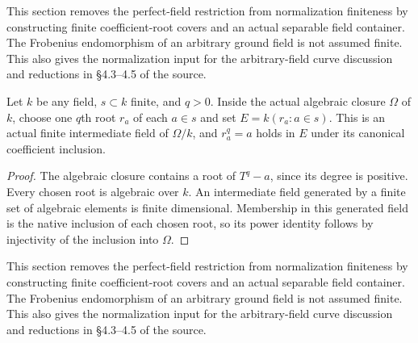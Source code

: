 \begingroup

This section removes the perfect-field restriction from normalization
finiteness by constructing finite coefficient-root covers and an actual
separable field container. The Frobenius endomorphism of an arbitrary
ground field is not assumed finite. This also gives the normalization
input for the arbitrary-field curve discussion and reductions in
\S4.3--4.5 of the source.

\begin{lemma}
\label{lem:normalization-finite-coefficient-root-field}
\leanok
Let $k$ be any field, $s\subset k$ finite, and $q>0$. Inside the actual
algebraic closure $\Omega$ of $k$, choose one $q$th root $r_a$ of each
$a\in s$ and set $E=k(r_a:a\in s)$. This is an actual finite intermediate
field of $\Omega/k$, and $r_a^q=a$ holds in $E$ under its canonical
coefficient inclusion.
\end{lemma}
\begin{proof}
The algebraic closure contains a root of $T^q-a$, since its degree is
positive. Every chosen root is algebraic over $k$. An intermediate field
generated by a finite set of algebraic elements is finite dimensional.
Membership in this generated field is the native inclusion of each
chosen root, so its power identity follows by injectivity of the
inclusion into $\Omega$.
\end{proof}

\endgroup

\begingroup

This section removes the perfect-field restriction from normalization
finiteness by constructing finite coefficient-root covers and an actual
separable field container. The Frobenius endomorphism of an arbitrary
ground field is not assumed finite. This also gives the normalization
input for the arbitrary-field curve discussion and reductions in
\S4.3--4.5 of the source.

